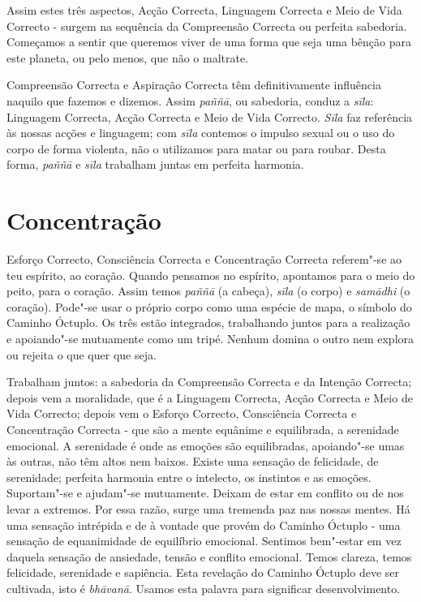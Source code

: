 Assim estes três aspectos, Acção Correcta, Linguagem Correcta e Meio de Vida
Correcto - surgem na sequência da Compreensão Correcta ou perfeita sabedoria.
Começamos a sentir que queremos viver de uma forma que seja uma bênção para este
planeta, ou pelo menos, que não o maltrate.

Compreensão Correcta e Aspiração Correcta têm definitivamente influência
naquilo que fazemos e dizemos. Assim \emph{paññā}, ou sabedoria, conduz a
\emph{sīla}: Linguagem Correcta, Acção Correcta e Meio de Vida Correcto.
\emph{Sīla} faz referência às nossas acções e linguagem; com \emph{sīla}
contemos o impulso sexual ou o uso do corpo de forma violenta, não o utilizamos
para matar ou para roubar. Desta forma, \emph{paññā} e \emph{sīla} trabalham
juntas em perfeita harmonia.

\section{Concentração}

Esforço Correcto, Consciência Correcta e Concentração Correcta referem"-se ao teu
espírito, ao coração. Quando pensamos no espírito, apontamos para o meio do
peito, para o coração. Assim temos \emph{paññā} (a cabeça), \emph{sīla} (o
corpo) e \emph{samādhi} (o coração). Pode"-se usar o próprio corpo como uma
espécie de mapa, o símbolo do Caminho Óctuplo. Os três estão integrados,
trabalhando juntos para a realização e apoiando"-se mutuamente como um tripé.
Nenhum domina o outro nem explora ou rejeita o que quer que seja.

Trabalham juntos: a sabedoria da Compreensão Correcta e da Intenção Correcta;
depois vem a moralidade, que é a Linguagem Correcta, Acção Correcta e Meio de
Vida Correcto; depois vem o Esforço Correcto, Consciência Correcta e Concentração
Correcta - que são a mente equânime e equilibrada, a serenidade emocional. A
serenidade é onde as emoções são equilibradas, apoiando"-se umas às outras, não
têm altos nem baixos. Existe uma sensação de felicidade, de serenidade; perfeita
harmonia entre o intelecto, os instintos e as emoções. Suportam"-se e ajudam"-se
mutuamente. Deixam de estar em conflito ou de nos levar a extremos. Por essa
razão, surge uma tremenda paz nas nossas mentes. Há uma sensação intrépida e de
à vontade que provém do Caminho Óctuplo - uma sensação de equanimidade de
equilíbrio emocional. Sentimos bem"-estar em vez daquela sensação de ansiedade,
tensão e conflito emocional. Temos clareza, temos felicidade, serenidade e sapiência.
Esta revelação do Caminho Óctuplo deve ser cultivada, isto é \emph{bhāvanā}.
Usamos esta palavra para significar desenvolvimento.

